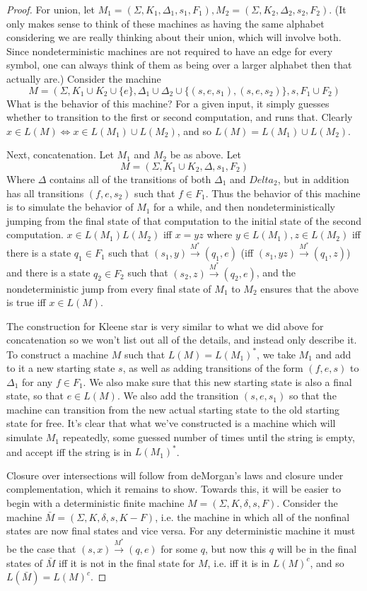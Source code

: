 \documentclass{article}
\theoremstyle{definition}
\theoremstyle{plain}
\theoremstyle{theorem}
\begin{document}
\begin{proof}
	For union, let $M_1 = (\Sigma,K_1,\Delta_1,s_1,F_1),M_2 = (\Sigma,K_2,\Delta_2,s_2,F_2)$. (It only makes sense to think of these machines as having the same alphabet considering we are really thinking about their union, which will involve both. Since nondeterministic machines are not required to have an edge for every symbol, one can always think of them as being over a larger alphabet then that actually are.) Consider the machine 
	\[ M=(\Sigma,K_1 \cup K_2 \cup \{e\},\Delta_1 \cup \Delta_2 \cup \{(s,e,s_1),(s,e,s_2)\},s,F_1 \cup F_2) \]
What is the behavior of this machine? For a given input, it simply guesses whether to transition to the first or second computation, and runs that. Clearly $x \in L(M) \iff x \in L(M_1) \cup L(M_2)$, and so $L(M) = L(M_1)\cup L(M_2)$. \par 
	Next, concatenation. Let $M_1$ and $M_2$ be as above. Let 
	\[ M = (\Sigma,K_1 \cup K_2,\Delta,s_1,F_2) \]
	Where $\Delta$ contains all of the transitions of both $\Delta_1$ and $Delta_2$, but in addition has all transitions $(f,e,s_2)$ such that $f \in F_1$. Thus the behavior of this machine is to simulate the behavior of $M_1$ for a while, and then nondeterministically jumping from the final state of that computation to the initial state of the second computation. $x \in L(M_1)L(M_2)$ iff $x = yz$ where $y \in L(M_1),z \in L(M_2)$ iff there is a state $q_1 \in F_1$ such that $(s_1,y) \overset{M^*}{\to} (q_1,e)$ (iff $(s_1,yz) \overset{M^*}{\to} (q_1,z)$) and there is a state $q_2 \in F_2$ such that $(s_2,z) \overset{M^*}{\to} (q_2,e)$, and the nondeterministic jump from every final state of $M_1$ to $M_2$ ensures that the above is true iff $x \in L(M)$. \par    
	The construction for Kleene star is very similar to what we did above for concatenation so we won't list out all of the details, and instead only describe it. To construct a machine $M$ such that $L(M) = L(M_1)^*$, we take $M_1$ and add to it a new starting state $s$, as well as adding transitions of the form $(f,e,s)$ to $\Delta_1$ for any $f \in F_1$. We also make sure that this new starting state is also a final state, so that $e \in L(M)$. We also add the transition $(s,e,s_1)$ so that the machine can transition from the new actual starting state to the old starting state for free. It's clear that what we've constructed is a machine which will simulate $M_1$ repeatedly, some guessed number of times until the string is empty, and accept iff the string is in $L(M_1)^*$. \par 
	Closure over intersections will follow from deMorgan's laws and closure under complementation, which it remains to show. Towards this, it will be easier to begin with a deterministic finite machine $M = (\Sigma,K,\delta,s,F)$. Consider the machine $\bar{M} = (\Sigma,K,\delta,s,K-F)$, i.e. the machine in which all of the nonfinal states are now final states and vice versa. For any deterministic machine it must be the case that $(s,x) \overset{M^*}{\to} (q,e)$ for some $q$, but now this $q$ will be in the final states of $\bar{M}$ iff it is not in the final state for $M$, i.e. iff it is in $L(M)^c$, and so $L(\bar{M}) = L(M)^c$. 
\end{proof}
\end{document}
